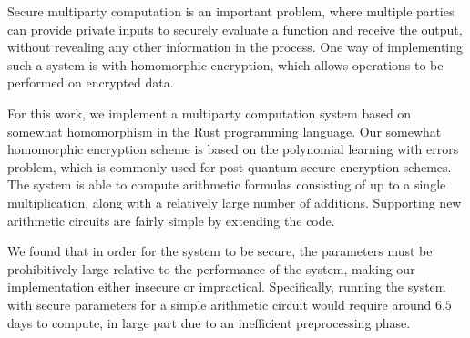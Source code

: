 \documentclass[../main.tex]{subfiles}
\begin{document}
Secure multiparty computation is an important problem, where multiple parties can provide private inputs to securely evaluate a function and receive the output, without revealing any other information in the process.
One way of implementing such a system is with homomorphic encryption, which allows operations to be performed on encrypted data.

For this work, we implement a multiparty computation system based on somewhat homomorphism in the Rust programming language.
Our somewhat homomorphic encryption scheme is based on the polynomial learning with errors problem,
which is commonly used for post-quantum secure encryption schemes. 
The system is able to compute arithmetic formulas consisting of up to a single multiplication, along with a relatively large number of additions.
Supporting new arithmetic circuits are fairly simple by extending the code.

We found that in order for the system to be secure, the parameters must be prohibitively large relative to the performance of the system, making our implementation either insecure or impractical.
Specifically, running the system with secure parameters for a simple arithmetic circuit would require around $6.5$ days to compute, in large part due to an inefficient preprocessing phase.
\end{document}
